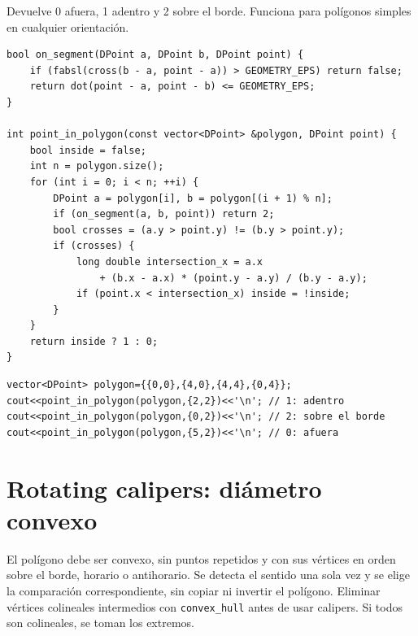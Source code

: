 Devuelve 0 afuera, 1 adentro y 2 sobre el borde. Funciona para pol\'igonos
simples en cualquier orientaci\'on.

\begin{lstlisting}[style=cpp]
bool on_segment(DPoint a, DPoint b, DPoint point) {
    if (fabsl(cross(b - a, point - a)) > GEOMETRY_EPS) return false;
    return dot(point - a, point - b) <= GEOMETRY_EPS;
}

int point_in_polygon(const vector<DPoint> &polygon, DPoint point) {
    bool inside = false;
    int n = polygon.size();
    for (int i = 0; i < n; ++i) {
        DPoint a = polygon[i], b = polygon[(i + 1) % n];
        if (on_segment(a, b, point)) return 2;
        bool crosses = (a.y > point.y) != (b.y > point.y);
        if (crosses) {
            long double intersection_x = a.x
                + (b.x - a.x) * (point.y - a.y) / (b.y - a.y);
            if (point.x < intersection_x) inside = !inside;
        }
    }
    return inside ? 1 : 0;
}
\end{lstlisting}

\begin{lstlisting}[style=cpp]
vector<DPoint> polygon={{0,0},{4,0},{4,4},{0,4}};
cout<<point_in_polygon(polygon,{2,2})<<'\n'; // 1: adentro
cout<<point_in_polygon(polygon,{0,2})<<'\n'; // 2: sobre el borde
cout<<point_in_polygon(polygon,{5,2})<<'\n'; // 0: afuera
\end{lstlisting}

\section{Rotating calipers: di\'ametro convexo}

El pol\'igono debe ser convexo, sin puntos repetidos y con sus v\'ertices en
orden sobre el borde, horario o antihorario. Se detecta el sentido una sola
vez y se elige la comparaci\'on correspondiente, sin copiar ni invertir el
pol\'igono. Eliminar v\'ertices colineales intermedios con \texttt{convex\_hull}
antes de usar calipers. Si todos son colineales, se toman los extremos.

